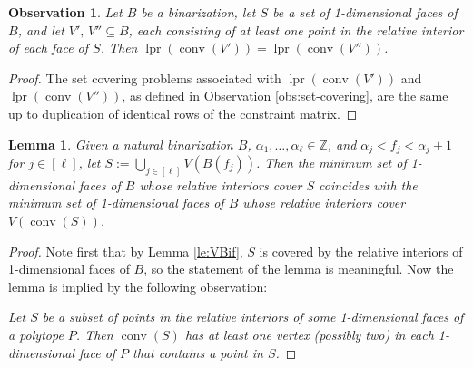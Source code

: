 \documentclass[11pt,a4paper]{article}
\newtheorem{lemma}[theorem]{Lemma}
\newtheorem{observation}[theorem]{Observation}
\newcommand{\conv}{\operatorname{conv}}
\newcommand{\Z}{\mathbb{Z}}
\newcommand{\1}{\textbf{1}}
\newcommand{\lpr}{\operatorname{lpr}}
\newcommand\manuel[1]{\textcolor{LimeGreen}{\textbf{ MA:  #1}}}
\newcommand\marco[1]{\textcolor{red}{\textbf{ MDS:  #1}}}
\begin{document}
\begin{observation}\label{obs:LRBf} 
Let $B$ be a binarization, 
let $S$ be a set of 1-dimensional faces of $B$, and let $V',\,V''\subseteq B$, each consisting of at least one point in the relative interior of each face of $S$. Then $\lpr(\conv(V'))=\lpr(\conv(V''))$.
\end{observation}
\begin{proof} The set covering problems associated with $\lpr(\conv(V'))$ and $\lpr(\conv(V''))$, as defined in Observation \ref{obs:set-covering}, are the same up to duplication of identical rows of the constraint matrix. 
\end{proof}






\begin{lemma} \label{le:michi} Given a natural binarization $B$, $\alpha_1,\dots,\alpha_{\ell}\in \Z$, 
and $\alpha_j< f_j<\alpha_j+1$ for $j\in[\ell]$, let $S:=\bigcup_{j\in [\ell]}V(B(f_j))$. Then
the minimum set of 1-dimensional faces of $B$ whose relative interiors cover  $S$ coincides with 
the minimum set of 1-dimensional faces of $B$ whose relative interiors cover  $V(\conv(S))$. 
\end{lemma}
\begin{proof} Note first that by Lemma \ref{le:VBif}, $S$ is covered by the relative interiors of 1-dimensional faces of  $B$, so the statement of the lemma is meaningful. Now the lemma is implied by the following observation: 

{\em Let  $S$ be a subset of points in the relative interiors of some 1-dimensional faces of a polytope $P$.  Then $\conv(S)$ has at least one vertex (possibly two)  in each 1-dimensional face of $P$ that contains a point in $S$.}
 \end{proof}
\end{document}
